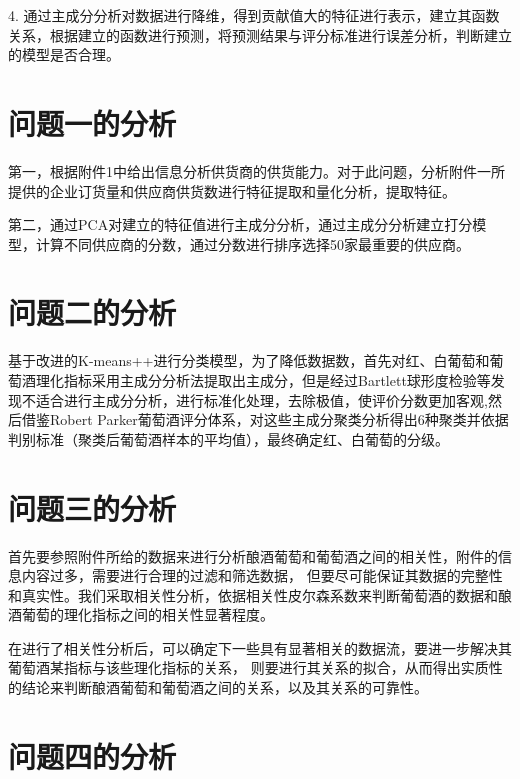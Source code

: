 \documentclass[UTF8]{ctexart}
\begin{document}
4. 通过主成分分析对数据进行降维，得到贡献值大的特征进行表示，建立其函数关系，根据建立的函数进行预测，将预测结果与评分标准进行误差分析，判断建立的模型是否合理。



\section{问题一的分析}

第一，根据附件1中给出信息分析供货商的供货能力。对于此问题，分析附件一所提供的企业订货量和供应商供货数进行特征提取和量化分析，提取特征。

第二，通过PCA对建立的特征值进行主成分分析，通过主成分分析建立打分模型，计算不同供应商的分数，通过分数进行排序选择50家最重要的供应商。


\section{问题二的分析}
基于改进的K-means++\cite{arthur2006k}进行分类模型，为了降低数据数，首先对红、白葡萄和葡萄酒理化指标采用主成分分析法提取出主成分，但是经过Bartlett球形度检验\cite{arsham2011bartlett}等发现不适合进行主成分分析，进行标准化处理，去除极值，使评价分数更加客观,然后借鉴Robert Parker葡萄酒评分体系\cite{hommerberg2011persuasiveness}，对这些主成分聚类分析得出6种聚类并依据判别标准（聚类后葡萄酒样本的平均值），最终确定红、白葡萄的分级。

\section{问题三的分析}
首先要参照附件所给的数据来进行分析酿酒葡萄和葡萄酒之间的相关性，附件的信息内容过多，需要进行合理的过滤和筛选数据，
但要尽可能保证其数据的完整性和真实性。我们采取相关性分析，依据相关性皮尔森系数来判断葡萄酒的数据和酿酒葡萄的理化指标之间的相关性显著程度。

在进行了相关性分析后，可以确定下一些具有显著相关的数据流，要进一步解决其葡萄酒某指标与该些理化指标的关系，
则要进行其关系的拟合，从而得出实质性的结论来判断酿酒葡萄和葡萄酒之间的关系，以及其关系的可靠性。
\section{问题四的分析}
\end{document}
